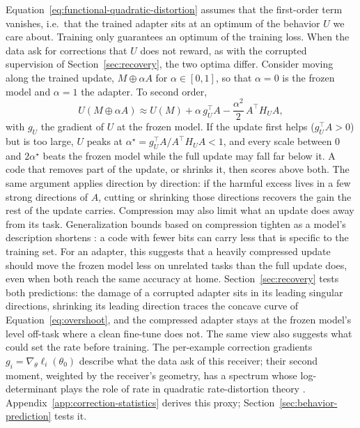 Equation~\ref{eq:functional-quadratic-distortion} assumes that the first-order term vanishes, i.e.\ that the trained adapter sits at an optimum of the behavior $U$ we care about.
Training only guarantees an optimum of the training loss.
When the data ask for corrections that $U$ does not reward, as with the corrupted supervision of Section~\ref{sec:recovery}, the two optima differ.
Consider moving along the trained update, $M\oplus\alpha A$ for $\alpha\in[0,1]$, so that $\alpha=0$ is the frozen model and $\alpha=1$ the adapter.
To second order,
\begin{equation}
    U(M\oplus\alpha A)
    \approx
    U(M)+\alpha\, g_U^\top A-\frac{\alpha^2}{2}\,A^\top H_U A ,
    \label{eq:overshoot}
\end{equation}
with $g_U$ the gradient of $U$ at the frozen model.
If the update first helps ($g_U^\top A>0$) but is too large, $U$ peaks at $\alpha^\star=g_U^\top A/A^\top H_U A<1$, and every scale between $0$ and $2\alpha^\star$ beats the frozen model while the full update may fall far below it.
A code that removes part of the update, or shrinks it, then scores above both.
The same argument applies direction by direction: if the harmful excess lives in a few strong directions of $A$, cutting or shrinking those directions recovers the gain the rest of the update carries.
\newline
Compression may also limit what an update does away from its task.
Generalization bounds based on compression tighten as a model's description shortens \citep{arora2018genbounds,lotfi2022pacbayescomp}: a code with fewer bits can carry less that is specific to the training set.
For an adapter, this suggests that a heavily compressed update should move the frozen model less on unrelated tasks than the full update does, even when both reach the same accuracy at home.
Section~\ref{sec:recovery} tests both predictions: the damage of a corrupted adapter sits in its leading singular directions, shrinking its leading direction traces the concave curve of Equation~\ref{eq:overshoot}, and the compressed adapter stays at the frozen model's level off-task where a clean fine-tune does not.
\newline
The same view also suggests what could set the rate before training.
The per-example correction gradients $g_i=\nabla_\theta\ell_i(\theta_0)$ describe what the data ask of this receiver; their second moment, weighted by the receiver's geometry, has a spectrum whose log-determinant plays the role of rate in quadratic rate-distortion theory \citep{cover2006elements}.
Appendix~\ref{app:correction-statistics} derives this proxy; Section~\ref{sec:behavior-prediction} tests it.

